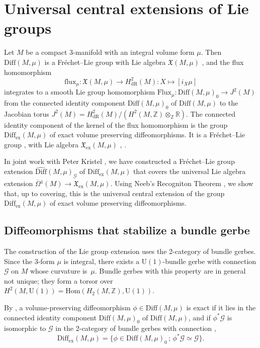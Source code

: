 \documentclass{article}
\newcommand{\ex}{\mathrm{ex}}
\newcommand{\dR}{\mathrm{dR}}
\newcommand{\fX}{\mathfrak{X}}
\newcommand{\Z}{\mathbb{Z}}
\newcommand{\R}{\mathbb{R}}
\newcommand{\Diff}{\mathrm{Diff}}
\newcommand{\oline}{\overline}
\newcommand{\cG}{\mathcal{G}}
\newcommand{\U}{\mathrm{U}}
\theoremstyle{definition}
\begin{document}
\section{Universal central extensions of Lie groups}\label{sec:LieGroups}


Let $M$ be a compact 3-manifold with an integral volume form $\mu$.
Then $\Diff(M,\mu)$ is a Fr\'echet--Lie group with Lie algebra $\fX(M,\mu)$ \cite{Hamilton1982}, 
and the flux homomorphism 
\[\mathrm{flux}_{\mu} \colon \fX(M,\mu) \rightarrow H^2_{\dR}(M): X \mapsto [i_{X}\mu]\]
integrates to a smooth Lie group homomorphism 
$\mathrm{Flux}_{\mu} \colon \Diff(M,\mu)_{0} \rightarrow J^2(M)$ 
from the connected identity component $\Diff(M,\mu)_{0}$ of $\Diff(M,\mu)$ to the Jacobian torus 
$J^2(M) = H^{2}_{\dR}(M)/(H^2(M,\Z)\otimes_{\Z}\R)$.
The connected identity component of the kernel of the flux  homomorphism is the group $\Diff_{\ex}(M,\mu)$ of exact volume preserving diffeomorphisms. It is a Fr\'echet--Lie group \cite{Gloeckner2006}, \cite[Thm.~III.11]{NeebWagemann2008} 
with Lie algebra $\fX_{\ex}(M,\mu)$ \cite{NeebVizman2003},
\cite[Prop.~3.8]{DiezJanssensNeebVizman2021}.

In joint work with Peter Kristel \cite{janssensHowActionThat2024}, 
we have constructed a Fr\'echet--Lie group extension $\widehat{\Diff}(M,\mu)_{\cG}$
of $\Diff_{\ex}(M,\mu)$ that covers the universal Lie algebra extension 
$\oline{\Omega}{}^1(M) \rightarrow \fX_{\ex}(M,\mu)$.
Using Neeb's Recogniton Theorem \cite{Neeb2002}, 
we show that, up to covering, this is the universal central extension of the group 
$\Diff_{\ex}(M,\mu)$ of exact volume preserving diffeomorphisms.

\subsection{Diffeomorphisms that stabilize a bundle gerbe}

The construction of the Lie group extension uses the 2-category of bundle gerbes.
Since the 3-form $\mu$ is integral, there exists a $\U(1)$-bundle gerbe with connection $\cG$ on $M$ whose curvature is~$\mu$.
Bundle gerbes with this property are in general not unique; they form a torsor over $H^2(M,\U(1)) = \mathrm{Hom}(H_2(M,\Z), \U(1))$.

By 
\cite[Rk.~3.4]{DiezJanssensNeebVizman2021},
a volume-preserving diffeomorphism $\phi\in \Diff(M,\mu)$ is exact if it lies in the connected identity component $\Diff(M,\mu)_{0}$ of $\Diff(M,\mu)$,
and if $\phi^*\cG$ is isomorphic to $\cG$ in the 2-category of bundle gerbes with connection \cite{Waldorf2007},
\begin{equation}
\Diff_{\ex}(M,\mu) = \{\phi \in \Diff(M,\mu)_{0}\,;\, \phi^*\cG \simeq \cG\}.
\end{equation}
\end{document}
